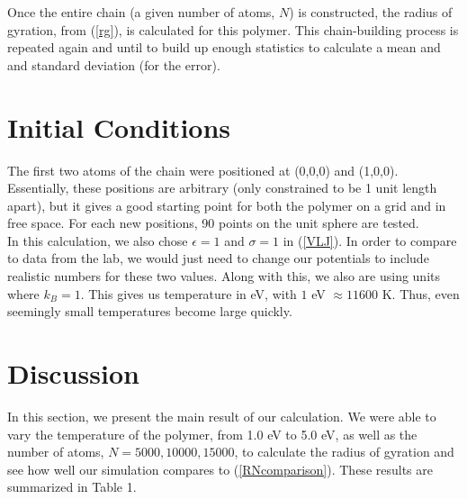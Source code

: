 \documentclass{article}
\begin{document}
\begin{multicols}{2}
Once the entire chain (a given number of atoms, $N$) is constructed, the radius of gyration, from (\ref{rg}), is calculated for this polymer.  This chain-building process is repeated again and until to build up enough statistics to calculate a mean and and standard deviation (for the error).  

\section{Initial Conditions}
\label{IC}

The first two atoms of the chain were positioned at (0,0,0) and (1,0,0).  Essentially, these positions are arbitrary (only constrained to be 1 unit length apart), but it gives a good starting point for both the polymer on a grid and in free space.   For each new positions, 90 points on the unit sphere are tested.  \\

In this calculation, we also chose $\epsilon =1$ and $\sigma=1$ in (\ref{VLJ}).  In order to compare to data from the lab, we would just need to change our potentials to include realistic numbers for these two values.  Along with this, we also are using units where $k_B=1$.  This gives us temperature in eV, with $1$ eV $\approx 11600$ K.  Thus, even seemingly small temperatures become large quickly.\\

\section{Discussion}
\label{discuss}

In this section, we present the main result of our calculation.  We were able to vary the temperature of the polymer, from 1.0 eV to 5.0 eV, as well as the number of atoms, $N=5000, 10000, 15000$, to calculate the radius of gyration and see how well our simulation compares to (\ref{RNcomparison}).  These results are summarized in Table 1.  \\


\end{multicols}
\end{document}
